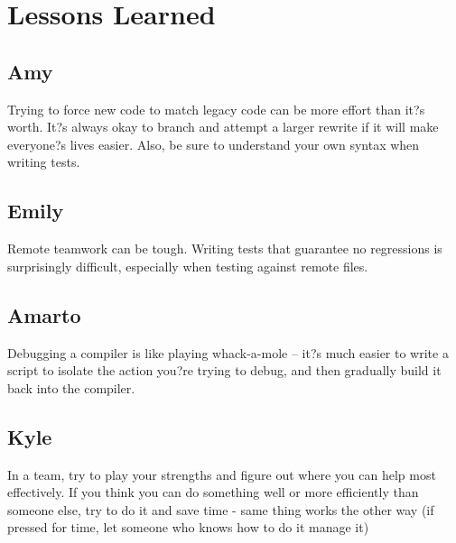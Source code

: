\chapter{Lessons Learned}

\section{Amy}
Trying to force new code to match legacy code can be more effort than it?s worth.  It?s always okay to branch and attempt a larger rewrite if it will make everyone?s lives easier.  Also, be sure to understand your own syntax when writing tests.

\section{Emily}
Remote teamwork can be tough. Writing tests that guarantee no regressions is surprisingly difficult, especially when testing against remote files.

\section{Amarto}
Debugging a compiler is like playing whack-a-mole -- it?s much easier to write a script to isolate the action you?re trying to debug, and then gradually build it back into the compiler.

\section{Kyle}
In a team, try to play your strengths and figure out where you can help most effectively. If you think you can do something well or more efficiently than someone else, try to do it and save time - same thing works the other way (if pressed for time, let someone who knows how to do it manage it)